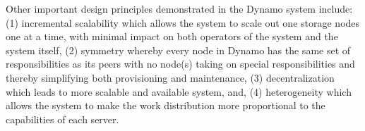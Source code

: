 \documentclass[11pt]{article}
\begin{document}
Other important design principles demonstrated in the Dynamo system 
include: (1) incremental scalability which allows the system to scale 
out one storage nodes one at a time, with minimal impact on both operators 
of the system and the system itself, (2) symmetry whereby every node in 
Dynamo has the same set of responsibilities as its peers with no node(s) 
taking on special responsibilities and thereby simplifying both 
provisioning and maintenance, (3) decentralization which leads to more 
scalable and available system, and, (4) heterogeneity which allows the 
system to make the work distribution more proportional to the capabilities 
of each server.


\nocite{*}

\end{document}
